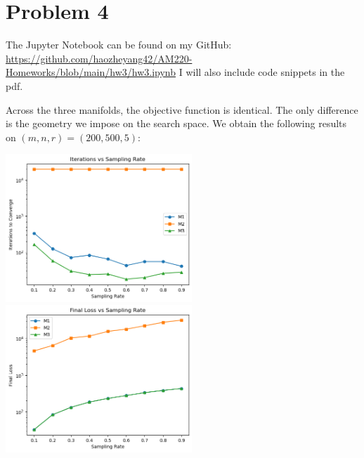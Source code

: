 \documentclass[11pt]{scrartcl}
\begin{document}
\newpage

\section{Problem 4}

The Jupyter Notebook can be found on my GitHub: \href{https://github.com/haozheyang42/AM220-
Homeworks/blob/main/hw3/hw3.ipynb}{https://github.com/haozheyang42/AM220-
Homeworks/blob/main/hw3/hw3.ipynb} I will also include code snippets in the pdf.

\bigskip

Across the three manifolds, the objective function is identical. The only difference is the geometry we impose on the search space. We obtain the following results on $(m, n, r) = (200, 500, 5)$: \begin{center}
    \includegraphics[width=7cm]{hw3-img/hw3-p4-1.png}
    \includegraphics[width=7cm]{hw3-img/hw3-p4-2.png}
\end{center}
\end{document}
